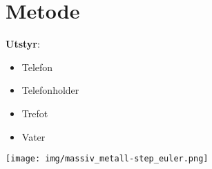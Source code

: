 \section{Metode}
\noindent\textbf{Utstyr}:
\begin{itemize}
	\item Telefon
    \item Telefonholder
	\item Trefot
	\item Vater
\end{itemize}

\texttt{[image: img/massiv\_metall-step\_euler.png]}
